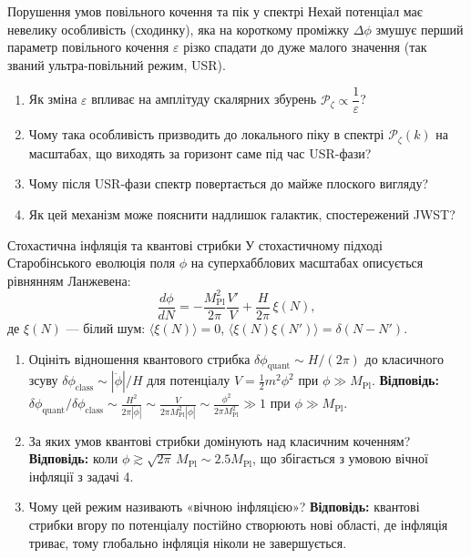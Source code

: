 
\begin{problem}{Порушення умов повільного кочення та пік у спектрі}
Нехай потенціал має невелику особливість (сходинку), яка на короткому проміжку
$\Delta\phi$ змушує перший параметр повільного кочення $\varepsilon$ різко спадати
до дуже малого значення (так званий ультра-повільний режим, USR).

\begin{enumerate}
    \item Як зміна $\varepsilon$ впливає на амплітуду скалярних збурень
          $\mathcal{P}_\zeta \propto \dfrac{1}{\varepsilon}$?
    \item Чому така особливість призводить до локального піку в спектрі
          $\mathcal{P}_\zeta(k)$ на масштабах, що виходять за горизонт саме під час
          USR-фази?
    \item Чому після USR-фази спектр повертається до майже плоского вигляду?
    \item Як цей механізм може пояснити надлишок галактик, спостережений JWST?
\end{enumerate}
\end{problem}


\begin{problem}{Стохастична інфляція та квантові стрибки}
У стохастичному підході Старобінського еволюція поля $\phi$ на суперхабблових
масштабах описується рівнянням Ланжевена:
\[
\frac{d\phi}{dN} = -\frac{M_{\text{Pl}}^2}{2\pi}\frac{V'}{V} + \frac{H}{2\pi}\,\xi(N),
\]
де $\xi(N)$ --- білий шум: $\langle\xi(N)\rangle = 0$,
$\langle\xi(N)\xi(N')\rangle = \delta(N-N')$.

\begin{enumerate}
    \item Оцініть відношення квантового стрибка $\delta\phi_{\text{quant}} \sim H/(2\pi)$
          до класичного зсуву $\delta\phi_{\text{class}} \sim |\dot\phi|/H$ для
          потенціалу $V = \frac{1}{2}m^2\phi^2$ при $\phi \gg M_{\text{Pl}}$.
          \textbf{Відповідь:} $\delta\phi_{\text{quant}} / \delta\phi_{\text{class}}
          \sim \frac{H^2}{2\pi |\dot\phi|} \sim \frac{V}{2\pi M_{\text{Pl}}^2 |\dot\phi|}
          \sim \frac{\phi^2}{2\pi M_{\text{Pl}}^2} \gg 1$ при $\phi \gg M_{\text{Pl}}$.
    \item За яких умов квантові стрибки домінують над класичним коченням?
          \textbf{Відповідь:} коли $\phi \gtrsim \sqrt{2\pi}\,M_{\text{Pl}} \sim 2.5 M_{\text{Pl}}$,
          що збігається з умовою вічної інфляції з задачі 4.
    \item Чому цей режим називають «вічною інфляцією»?
          \textbf{Відповідь:} квантові стрибки вгору по потенціалу постійно
          створюють нові області, де інфляція триває, тому глобально
          інфляція ніколи не завершується.
\end{enumerate}
\end{problem}